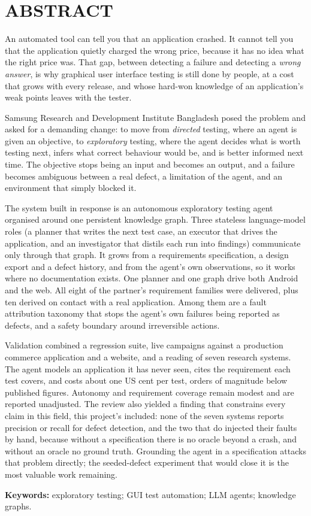\chapter*{ABSTRACT}

An automated tool can tell you that an application crashed. It cannot tell you
that the application quietly charged the wrong price, because it has no idea
what the right price was. That gap, between detecting a failure and detecting a
\emph{wrong answer}, is why graphical user interface testing is still done by
people, at a cost that grows with every release, and whose hard-won knowledge of an
application's weak points leaves with the tester.

Samsung Research and Development Institute Bangladesh posed the problem and
asked for a demanding change: to move from \emph{directed} testing, where an
agent is given an objective, to \emph{exploratory} testing, where the agent
decides what is worth testing next, infers what correct behaviour would be, and
is better informed next time. The objective stops being an input
and becomes an output, and a failure becomes ambiguous between a real defect, a
limitation of the agent, and an environment that simply blocked it.

The system built in response is an autonomous exploratory testing agent
organised around one persistent knowledge graph. Three stateless
language-model roles (a planner that writes the next test case, an executor that
drives the application, and an investigator that distils each run into
findings) communicate only through that graph. It grows from a requirements
specification, a design export and a defect history, and from the agent's own
observations, so it works where no documentation exists. One planner and one
graph drive both Android and the web. All eight of the partner's requirement
families were delivered, plus ten derived on contact with a real
application. Among them are a fault attribution taxonomy that stops the
agent's own failures being reported as defects, and a safety boundary
around irreversible actions.

Validation combined a regression suite, live campaigns against a production
commerce application and a website, and a reading of seven research
systems. The agent models an application it has never seen, cites the
requirement each test covers, and costs about one US cent per test, orders of
magnitude below published figures. Autonomy and requirement coverage
remain modest and are reported unadjusted. The review also yielded a finding
that constrains every claim in this field, this project's included: none of the
seven systems reports precision or recall for defect detection, and the two that
do injected their faults by hand, because without a specification there is no
oracle beyond a crash, and without an oracle no ground truth. Grounding the
agent in a specification attacks that problem directly; the seeded-defect
experiment that would close it is the most valuable work remaining.

\vspace{0pt}
\noindent\textbf{Keywords:} exploratory testing; GUI test automation; LLM agents; knowledge graphs.
\clearpage
